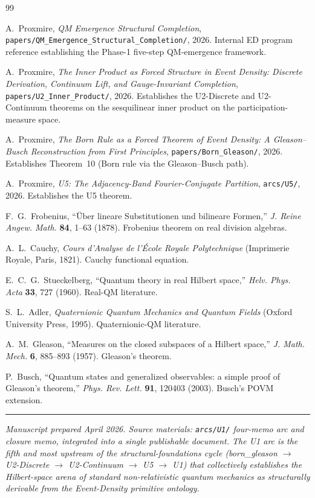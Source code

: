 \documentclass[11pt,a4paper]{article}
\begin{document}
\begin{thebibliography}{99}

A.~Proxmire, \emph{QM Emergence Structural Completion}, \texttt{papers/QM\_Emergence\_Structural\_Completion/}, 2026. Internal ED program reference establishing the Phase-1 five-step QM-emergence framework.

A.~Proxmire, \emph{The Inner Product as Forced Structure in Event Density: Discrete Derivation, Continuum Lift, and Gauge-Invariant Completion}, \texttt{papers/U2\_Inner\_Product/}, 2026. Establishes the U2-Discrete and U2-Continuum theorems on the sesquilinear inner product on the participation-measure space.

A.~Proxmire, \emph{The Born Rule as a Forced Theorem of Event Density: A Gleason--Busch Reconstruction from First Principles}, \texttt{papers/Born\_Gleason/}, 2026. Establishes Theorem~10 (Born rule via the Gleason--Busch path).

A.~Proxmire, \emph{U5: The Adjacency-Band Fourier-Conjugate Partition}, \texttt{arcs/U5/}, 2026. Establishes the U5 theorem.

F.~G.~Frobenius, ``\"Uber lineare Substitutionen und bilineare Formen,'' \emph{J. Reine Angew. Math.} \textbf{84}, 1--63 (1878). Frobenius theorem on real division algebras.

A.~L.~Cauchy, \emph{Cours d'Analyse de l'\'Ecole Royale Polytechnique} (Imprimerie Royale, Paris, 1821). Cauchy functional equation.

E.~C.~G.~Stueckelberg, ``Quantum theory in real Hilbert space,'' \emph{Helv. Phys. Acta} \textbf{33}, 727 (1960). Real-QM literature.

S.~L.~Adler, \emph{Quaternionic Quantum Mechanics and Quantum Fields} (Oxford University Press, 1995). Quaternionic-QM literature.

A.~M.~Gleason, ``Measures on the closed subspaces of a Hilbert space,'' \emph{J. Math. Mech.} \textbf{6}, 885--893 (1957). Gleason's theorem.

P.~Busch, ``Quantum states and generalized observables: a simple proof of Gleason's theorem,'' \emph{Phys. Rev. Lett.} \textbf{91}, 120403 (2003). Busch's POVM extension.

\end{thebibliography}

\vspace{1em}
\noindent\rule{\linewidth}{0.4pt}
\vspace{0.2em}

\noindent\emph{Manuscript prepared April 2026. Source materials: \texttt{arcs/U1/} four-memo arc and closure memo, integrated into a single publishable document. The U1 arc is the fifth and most upstream of the structural-foundations cycle (born\_gleason $\to$ U2-Discrete $\to$ U2-Continuum $\to$ U5 $\to$ U1) that collectively establishes the Hilbert-space arena of standard non-relativistic quantum mechanics as structurally derivable from the Event-Density primitive ontology.}
\end{document}
